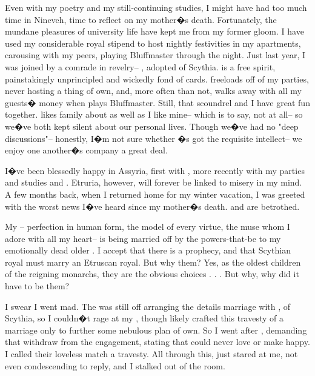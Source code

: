 \documentclass[char]{Kos}
\begin{document}
Even with my poetry and my still-continuing studies, I might have had too much time in Nineveh, time to reflect on my mother�s death. Fortunately, the mundane pleasures of university life have kept me from my former gloom. I have used my considerable royal stipend to host nightly festivities in my apartments, carousing with my peers, playing Bluffmaster through the night. Just last year, I was joined by a comrade in revelry-- \cWard{\name}, adopted \cWard{\prince} of Scythia. \cWard{\nickname} is a free spirit, painstakingly unprincipled and wickedly fond of cards. \cWard{\They} freeloads off of my parties, never hosting a thing of \cWard{\their} own, and, more often than not, \cWard{\they} walks away with all my guests� money when \cWard{\they} plays Bluffmaster. Still, that scoundrel and I have great fun together. \cWard{\nickname} likes \cWard{\their} family about as well as I like mine-- which is to say, not at all-- so we�ve both kept silent about our personal lives. Though we�ve had no "deep discussions"-- honestly, I�m not sure whether \cWard{\they}�s got the requisite intellect-- we enjoy one another�s company a great deal.

I�ve been blessedly happy in Assyria, first with \cBride{\nickname}, more recently with my parties and studies and \cWard{\nickname}. Etruria, however, will forever be linked to misery in my mind. A few months back, when I returned home for my winter vacation, I was greeted with the worst news I�ve heard since my mother�s death. \cBride{\nickname} and \cGroom{\nickname} are betrothed.

My \cBride{\nickname}-- perfection in human form, the model of every virtue, the muse whom I adore with all my heart-- is being married off by the powers-that-be to my emotionally dead older \cGroom{\sibling}. I accept that there is a prophecy, and that Scythian royal must marry an Etruscan royal. But why them? Yes, as the oldest children of the reigning monarchs, they are the obvious choices . . . But why, why did it have to be them? 

I swear I went mad. The \cEtruriaKing{\monarch} was still off arranging the details marriage with \cScythiaKing{\name}, \cScythiaKing{\monarch} of Scythia, so I couldn�t rage at my \cEtruriaKing{\parent}, though \cEtruriaKing{\they} likely crafted this travesty of a marriage only to further some nebulous plan of \cScythiaKing{\their} own. So I went after \cGroom{\nickname}, demanding that \cGroom{\they} withdraw from the engagement, stating that \cGroom{\they} could never love \cBride{\nickname} or make \cBride{\them} happy. I called their loveless match a travesty. All through this, \cGroom{\they} just stared at me, not even condescending to reply, and I stalked out of the room.
\end{document}
